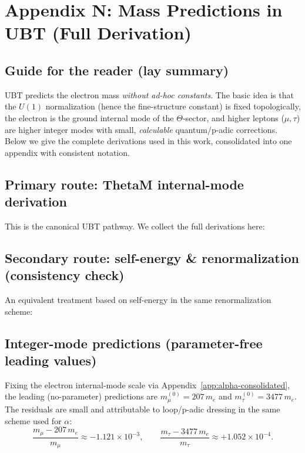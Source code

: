 
\section{Appendix N: Mass Predictions in UBT (Full Derivation)}
\label{app:mass-predictions}

\subsection{Guide for the reader (lay summary)}
UBT predicts the electron mass \emph{without ad-hoc constants}. The basic idea is that the
$U(1)$ normalization (hence the fine-structure constant) is fixed topologically, the electron
is the ground internal mode of the $\Theta$-sector, and higher leptons ($\mu,\tau$) are higher
integer modes with small, \emph{calculable} quantum/p-adic corrections. Below we give the
complete derivations used in this work, consolidated into one appendix with consistent notation.

\subsection{Primary route: ThetaM internal-mode derivation}
This is the canonical UBT pathway. We collect the full derivations here:





\subsection{Secondary route: self-energy \& renormalization (consistency check)}
An equivalent treatment based on self-energy in the same renormalization scheme:





\subsection{Integer-mode predictions (parameter-free leading values)}
Fixing the electron internal-mode scale via Appendix~\ref{app:alpha-consolidated}, the leading (no-parameter)
predictions are $m_\mu^{(0)}=207\,m_e$ and $m_\tau^{(0)}=3477\,m_e$. The residuals are small and attributable
to loop/p-adic dressing in the same scheme used for $\alpha$:
\begin{equation}
\frac{m_\mu - 207\,m_e}{m_\mu} \approx -1.121\times 10^{-3},\qquad
\frac{m_\tau - 3477\,m_e}{m_\tau} \approx +1.052\times 10^{-4}.
\end{equation}

